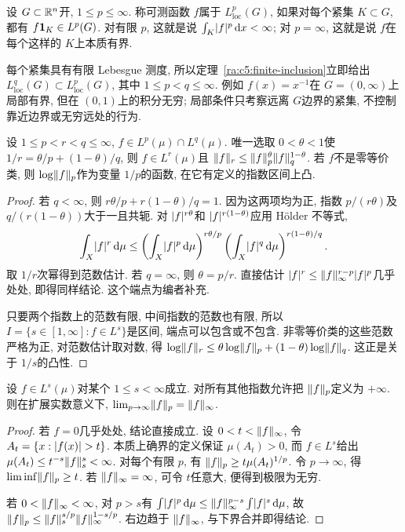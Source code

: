 \begin{definition}[局部可积性]
设 $G\subset\mathbb R^n$开, $1\le p\le\infty$. 称可测函数 $f$属于 $L^p_{\mathrm{loc}}(G)$, 如果对每个紧集 $K\subset G$, 都有 $f\mathbf 1_K\in L^p(G)$. 对有限 $p$, 这就是说 $\int_K\lvert f\rvert^p\,\mathrm d x<\infty$; 对 $p=\infty$, 这就是说 $f$在每个这样的 $K$上本质有界.
\end{definition}

每个紧集具有有限 Lebesgue 测度, 所以定理~\ref{ra:c5:finite-inclusion}立即给出 $L^q_{\mathrm{loc}}(G)\subset L^p_{\mathrm{loc}}(G)$, 其中 $1\le p<q\le\infty$. 例如 $f(x)=x^{-1}$在 $G=(0,\infty)$上局部有界, 但在 $(0,1)$上的积分无穷; 局部条件只考察远离 $G$边界的紧集, 不控制靠近边界或无穷远处的行为.

\begin{theorem}\label{ra:c5:interpolation}
设 $1\le p<r<q\le\infty$, $f\in L^p(\mu)\cap L^q(\mu)$. 唯一选取 $0<\theta<1$使 $1/r=\theta/p+(1-\theta)/q$, 则 $f\in L^r(\mu)$且 $\lVert f\rVert_r\le\lVert f\rVert_p^\theta\lVert f\rVert_q^{1-\theta}$.
若 $f$不是零等价类, 则 $\log\lVert f\rVert_p$作为变量 $1/p$的函数, 在它有定义的指数区间上凸.
\end{theorem}
\begin{proof}
若 $q<\infty$, 则 $r\theta/p+r(1-\theta)/q=1$. 因为这两项均为正, 指数 $p/(r\theta)$及 $q/(r(1-\theta))$大于一且共轭. 对 $\lvert f\rvert^{r\theta}$和 $\lvert f\rvert^{r(1-\theta)}$应用 Hölder 不等式,
\[
 \int_X\lvert f\rvert^r\,\mathrm d\mu
 \le\left(\int_X\lvert f\rvert^p\,\mathrm d\mu\right)^{r\theta/p}
     \left(\int_X\lvert f\rvert^q\,\mathrm d\mu\right)^{r(1-\theta)/q}.
\]
取 $1/r$次幂得到范数估计. 若 $q=\infty$, 则 $\theta=p/r$. 直接估计 $\lvert f\rvert^r\le\lVert f\rVert_\infty^{r-p}\lvert f\rvert^p$几乎处处, 即得同样结论. 这个端点为编者补充.

只要两个指数上的范数有限, 中间指数的范数也有限, 所以 $I=\{s\in[1,\infty]:f\in L^s\}$是区间, 端点可以包含或不包含. 非零等价类的这些范数严格为正, 对范数估计取对数, 得 $\log\lVert f\rVert_r\le\theta\log\lVert f\rVert_p+(1-\theta)\log\lVert f\rVert_q$. 这正是关于 $1/s$的凸性.
\end{proof}

\begin{theorem}\label{ra:c5:limit-infty}
设 $f\in L^s(\mu)$对某个 $1\le s<\infty$成立. 对所有其他指数允许把 $\lVert f\rVert_p$定义为 $+\infty$. 则在扩展实数意义下, $\lim_{p\to\infty}\lVert f\rVert_p=\lVert f\rVert_\infty$.
\end{theorem}
\begin{proof}
若 $f=0$几乎处处, 结论直接成立. 设 $0<t<\lVert f\rVert_\infty$, 令 $A_t=\{x:\lvert f(x)\rvert>t\}$. 本质上确界的定义保证 $\mu(A_t)>0$, 而 $f\in L^s$给出 $\mu(A_t)\le t^{-s}\lVert f\rVert_s^s<\infty$. 对每个有限 $p$, 有 $\lVert f\rVert_p\ge t\mu(A_t)^{1/p}$. 令 $p\to\infty$, 得 $\liminf\lVert f\rVert_p\ge t$. 若 $\lVert f\rVert_\infty=\infty$, 可令 $t$任意大, 便得到极限为无穷.

若 $0<\lVert f\rVert_\infty<\infty$, 对 $p>s$有 $\int\lvert f\rvert^p\,\mathrm d\mu\le\lVert f\rVert_\infty^{p-s}\int\lvert f\rvert^s\,\mathrm d\mu$, 故 $\lVert f\rVert_p\le\lVert f\rVert_s^{s/p}\lVert f\rVert_\infty^{1-s/p}$. 右边趋于 $\lVert f\rVert_\infty$, 与下界合并即得结论.
\end{proof}

